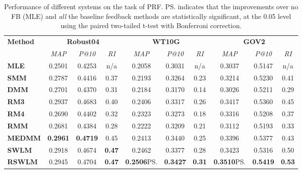\begin{table}[tbp]
\caption{\label{tbl_prf}Performance of different systems on the task of PRF. \ps indicates that the improvements over no FB (MLE) and \emph{all} the baseline feedback methods are statistically significant, at the 0.05 level using the paired two-tailed t-test with Bonferroni correction.}
\begin{adjustbox}{max width=\columnwidth}
\begin{tabular}{lccccccccc}
\toprule
\multirow{2}{*}{\textbf{Method}} &
\multicolumn{3}{c}{\textbf{Robust04}} & \multicolumn{3}{c}{\textbf{WT10G}} & \multicolumn{3}{c}{\textbf{GOV2}} 
\\ \cmidrule(lr){2-4} \cmidrule(lr){5-7} \cmidrule(lr){8-10}
& \textit{MAP} & \textit{P@10} & \textit{RI} & \textit{MAP} & \textit{P@10} &  \textit{RI} &  \textit{MAP} & \textit{P@10}   & \textit{RI} 
\\ \midrule
\textbf{MLE} & 0.2501 & 0.4253 & n/a & 0.2058 & 0.3031 & n/a & 0.3037 & 0.5147 & n/a
\\ 
\textbf{SMM} & 0.2787 & 0.4416 & 0.37 & 0.2193 & 0.3264 & 0.23 & 0.3214 & 0.5230 & 0.41 \\ 
\textbf{DMM} & 0.2701 & 0.4370 & 0.31 & 0.2184 & 0.3170 & 0.14 & 0.3026 & 0.5211 & 0.29 \\ 
\textbf{RM3} & 0.2937 & 0.4683 & 0.40 & 0.2406 & 0.3317 & 0.26 & 0.3417 & 0.5360 & 0.45 \\ 
\textbf{RM4} & 0.2690 & 0.4402 & 0.32 & 0.2323 & 0.3273 & 0.18 & 0.3316 & 0.5208 & 0.37 \\ 
\textbf{RMM} & 0.2681 & 0.4384 & 0.28 & 0.2222 & 0.3209 & 0.21 & 0.3112 & 0.5193 & 0.33 \\ 
\textbf{MEDMM} & \textbf{0.2961} & \textbf{0.4719} & 0.45  & 0.2413 & 0.3440 & 0.25 & 0.3396 & 0.5377 & 0.43 \\ 
\textbf{SWLM} & 0.2918 & 0.4674 & \textbf{0.47} & 0.2462 & 0.3377 & 0.28 & 0.3423 & 0.5316 & 0.50 \\ 
\textbf{RSWLM} & 0.2945 & 0.4704 & \textbf{0.47} &\textbf{0.2506}\ps & \textbf{0.3427} & \textbf{0.31} & \textbf{0.3510}\ps & \textbf{0.5419} & \textbf{0.53}
\\ \bottomrule 
\end{tabular}
\end{adjustbox}
\end{table}


